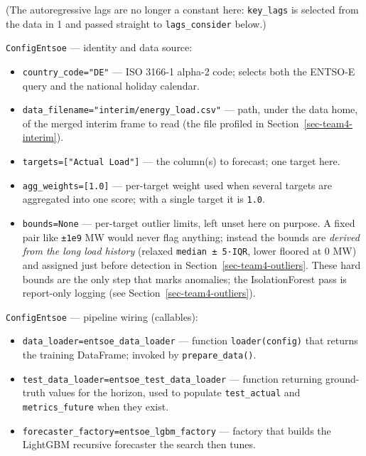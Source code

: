 \documentclass[
  english,
  letterpaper,
]{scrbook}
\providecommand{\tightlist}{%
  \setlength{\itemsep}{0pt}\setlength{\parskip}{0pt}}
\begin{document}
(The autoregressive lags are no longer a constant here:
\texttt{key\_lags} is selected from the data in 1 and passed straight to
\texttt{lags\_consider} below.)

\texttt{ConfigEntsoe} --- identity and data source:

\begin{itemize}
\tightlist
\item
  \texttt{country\_code="DE"} --- ISO 3166-1 alpha-2 code; selects both
  the ENTSO-E query and the national holiday calendar.
\item
  \texttt{data\_filename="interim/energy\_load.csv"} --- path, under the
  data home, of the merged interim frame to read (the file profiled in
  Section~\ref{sec-team4-interim}).
\item
  \texttt{targets={[}"Actual\ Load"{]}} --- the column(s) to forecast;
  one target here.
\item
  \texttt{agg\_weights={[}1.0{]}} --- per-target weight used when
  several targets are aggregated into one score; with a single target it
  is \texttt{1.0}.
\item
  \texttt{bounds=None} --- per-target outlier limits, left unset here on
  purpose. A fixed pair like \texttt{±1e9} MW would never flag anything;
  instead the bounds are \emph{derived from the long load history}
  (relaxed \texttt{median\ ±\ 5·IQR}, lower floored at 0 MW) and
  assigned just before detection in Section~\ref{sec-team4-outliers}.
  These hard bounds are the only step that marks anomalies; the
  IsolationForest pass is report-only logging (see
  Section~\ref{sec-team4-outliers}).
\end{itemize}

\texttt{ConfigEntsoe} --- pipeline wiring (callables):

\begin{itemize}
\tightlist
\item
  \texttt{data\_loader=entsoe\_data\_loader} --- function
  \texttt{loader(config)} that returns the training DataFrame; invoked
  by \texttt{prepare\_data()}.
\item
  \texttt{test\_data\_loader=entsoe\_test\_data\_loader} --- function
  returning ground-truth values for the horizon, used to populate
  \texttt{test\_actual} and \texttt{metrics\_future} when they exist.
\item
  \texttt{forecaster\_factory=entsoe\_lgbm\_factory} --- factory that
  builds the LightGBM recursive forecaster the search then tunes.
\end{itemize}
\end{document}
